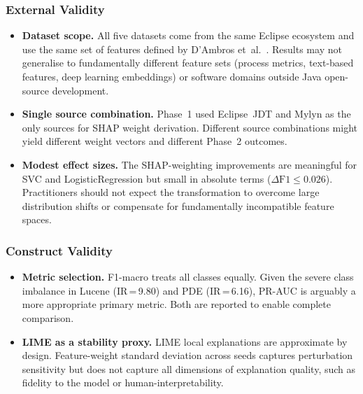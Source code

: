 \documentclass[12pt, a4paper]{article}
\newcommand{\model}[1]{\textsf{#1}}
\begin{document}
\subsubsection*{External Validity}
\begin{itemize}[leftmargin=*, itemsep=3pt]
  \item \textbf{Dataset scope.} All five datasets come from the same Eclipse
        ecosystem and use the same set of features defined by D'Ambros
        et~al.~\cite{dambros2012}. Results may not generalise to fundamentally
        different feature sets (process metrics, text-based features, deep
        learning embeddings) or software domains outside Java open-source
        development.

  \item \textbf{Single source combination.} Phase~1 used Eclipse~JDT and
        Mylyn as the only sources for SHAP weight derivation. Different source
        combinations might yield different weight vectors and different Phase~2
        outcomes.

  \item \textbf{Modest effect sizes.} The SHAP-weighting improvements are
        meaningful for \model{SVC} and \model{LogisticRegression} but small in
        absolute terms ($\Delta\text{F1} \leq 0.026$). Practitioners should
        not expect the transformation to overcome large distribution shifts or
        compensate for fundamentally incompatible feature spaces.
\end{itemize}

\subsubsection*{Construct Validity}
\begin{itemize}[leftmargin=*, itemsep=3pt]
  \item \textbf{Metric selection.} F1-macro treats all classes equally.
        Given the severe class imbalance in Lucene (IR\,=\,9.80) and PDE
        (IR\,=\,6.16), PR-AUC is arguably a more appropriate primary metric.
        Both are reported to enable complete comparison.

  \item \textbf{LIME as a stability proxy.} LIME local explanations are
        approximate by design. Feature-weight standard deviation across seeds
        captures perturbation sensitivity but does not capture all dimensions
        of explanation quality, such as fidelity to the model or
        human-interpretability.
\end{itemize}
\end{document}
